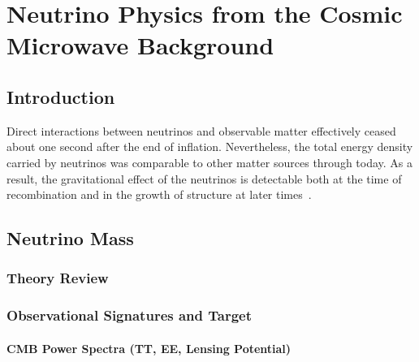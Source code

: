  
\chapter{Neutrino Physics from the Cosmic Microwave Background}
\renewcommand*\thesection{\arabic{section}}

\def\beq{\begin{equation}}
\def\eeq{\end{equation}}

\def\bea{\begin{eqnarray}}
\def\eea{\end{eqnarray}}

\def\Neff{N_{\mathrm eff}}
\def\gtrsim{\raise-.75ex\hbox{$\buildrel>\over\sim$}}

\section{Introduction}

Direct interactions between neutrinos and observable matter effectively ceased about one second after the end of inflation.  Nevertheless, the total energy density carried by neutrinos was comparable to other matter sources through today.  As a result, the gravitational effect of the neutrinos is detectable both at the time of recombination and in the growth of structure at later times~\cite{Abazajian:2013oma}.


\section{Neutrino Mass}

\subsection{Theory Review}



\subsection{Observational Signatures and Target}
\subsubsection{CMB Power Spectra (TT, EE, Lensing Potential)}
